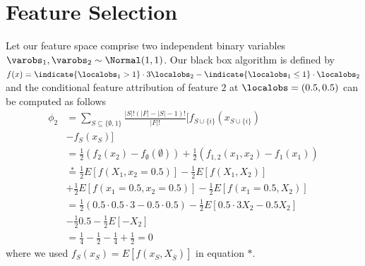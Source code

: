 \section{Feature Selection} 
\label{sec:suppl_featureselect} 
Let our feature space comprise two independent binary variables $\varobs_{1}, \varobs_{2}\sim \Normal(1, 1)$.
Our black box algorithm is defined by $f(x)=\indicate{\localobs_{1}>1}\cdot 3\localobs_{2}-\indicate{\localobs_{1}\leq 1}\cdot \localobs_{2}$ and the conditional feature attribution of feature $2$ at $\localobs=(0.5, 0.5)$ can be computed as follows
\begin{align*}
    \phi_{2} &= \sum_{S\subseteq \{\emptyset, 1\}} \frac{|S| !(|F|-|S|-1) !}{|F| !}[f_{S \cup\{i\}}\left(x_{S \cup\{i\}}\right)
    \\& -f_{S}\left(x_{S}\right)]\\
    & = \frac{1}{2}(f_{2}(x_{2})-f_{\emptyset}(\emptyset)) + \frac{1}{2} (f_{1, 2}(x_{1}, x_{2}) - f_{1}(x_{1}))\\
    & \overset{*}{=} \frac{1}{2}E[f(X_{1}, x_{2}=0.5)] - \frac{1}{2}E[f(X_{1}, X_{2})] \\& + \frac{1}{2} E[f(x_{1}=0.5, x_{2}=0.5)] - \frac{1}{2} E[f(x_{1}=0.5, X_{2})]\\
    & = \frac{1}{2} (0.5\cdot 0.5\cdot 3 -0.5\cdot 0.5 ) - \frac{1}{2}E[0.5\cdot 3X_2-0.5X_2] \\& - \frac{1}{2} 0.5 - \frac{1}{2}E[-X_{2}] \\
    & = \frac{1}{4} - \frac{1}{2} - \frac{1}{4} + \frac{1}{2} = 0
\end{align*}
where we used $f_S(x_S)=E[f(x_S,X_{\bar{S}})]$ in equation $*$.

